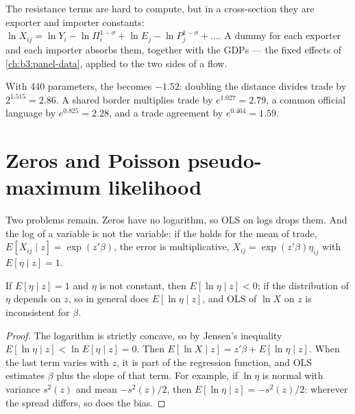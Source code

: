 The resistance terms are hard to compute, but in a cross-section they are
exporter and importer constants: $\ln X_{ij} = \ln Y_i - \ln \Pi_i^{1-\sigma} + \ln E_j - \ln
P_j^{1-\sigma} + \dots$. A dummy for each exporter and each importer absorbs them,
together with the GDPs --- the fixed effects of \cref{ch:b3:panel-data}, applied to
the two sides of a flow.

\label{lst:b3:gravity:fe}

\label{out:b3:gravity:fe}

With 440 parameters, the  becomes $-1.52$: doubling the
distance divides trade by $2^{1.515} = 2.86$. A shared border multiplies trade by
$e^{1.027} = 2.79$, a common official language by $e^{0.825} = 2.28$, and a trade
agreement by $e^{0.464} = 1.59$.

\section{Zeros and Poisson pseudo-maximum likelihood}\label{sec:b3:gravity:ppml}

Two problems remain. Zeros have no logarithm, so OLS on logs drops them. And
the log of a variable is not the variable: if the  holds for the
mean of trade, $E[X_{ij} \mid z] = \exp(z'\beta)$, the error is multiplicative, $X_{ij} =
\exp(z'\beta)\eta_{ij}$ with $E[\eta \mid z] = 1$.

\begin{proposition}\label{prop:b3:gravity:jensen}
If $E[\eta \mid z] = 1$ and $\eta$ is not constant, then $E[\ln \eta \mid z] < 0$; if the
distribution of $\eta$ depends on $z$, so in general does $E[\ln \eta \mid z]$, and OLS of $\ln X$
on $z$ is inconsistent for $\beta$.
\end{proposition}

\begin{proof}
The logarithm is strictly concave, so by Jensen's inequality $E[\ln \eta \mid z] < \ln
E[\eta \mid z] = 0$. Then $E[\ln X \mid z] = z'\beta + E[\ln \eta \mid z]$. When the last term
varies with $z$, it is part of the regression function, and OLS estimates $\beta$
plus the slope of that term. For example, if $\ln \eta$ is normal with variance $s^2(z)$
and mean $-s^2(z)/2$, then $E[\ln \eta \mid z] = -s^2(z)/2$: wherever the spread differs, so
does the bias.
\end{proof}


